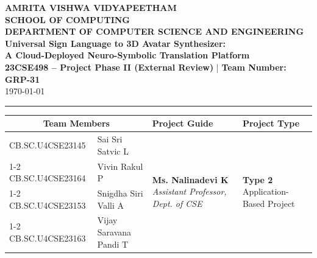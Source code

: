 \documentclass[11pt, a4paper]{article}
\begin{document}
\noindent
\begin{minipage}{\textwidth}
    \centering
    {\Large \textbf{\textcolor{amritaMaroon}{
    AMRITA VISHWA VIDYAPEETHAM \\
    SCHOOL OF COMPUTING \\
    DEPARTMENT OF COMPUTER SCIENCE AND ENGINEERING \\
    }}}
    \vspace{0.2cm}
    {\large \textbf{Universal Sign Language to 3D Avatar Synthesizer: \\ A Cloud-Deployed Neuro-Symbolic Translation Platform}} \\[0.1cm]
    \textbf{23CSE498 -- Project Phase II (External Review)} \quad | \quad \textbf{Team Number: GRP-31} \\
    \today
\end{minipage}

\vspace{0.3cm}
\hrule
\vspace{0.3cm}

\noindent
\begin{center}
    \renewcommand{\arraystretch}{1.4}
    \setlength{\tabcolsep}{6pt}
    \begin{tabular}{|l|p{4.8cm}|p{4.6cm}|p{3.2cm}|}
        \hline
        \multicolumn{2}{|c|}{\textbf{Team Members}} & \textbf{Project Guide} & \textbf{Project Type} \\
        \hline
        \small CB.SC.U4CSE23145 & \small \raggedright Sai Sri Satvic L &
        \multirow{4}{=}{\raggedright \small \textbf{Ms. Nalinadevi K} \newline \textit{Assistant Professor, \newline Dept. of CSE}} &
        \multirow{4}{=}{\raggedright \small \textbf{Type 2} \newline Application-Based Project} \\ \cline{1-2}
        \small CB.SC.U4CSE23164 & \small Vivin Rakul P & & \\ \cline{1-2}
        \small CB.SC.U4CSE23153 & \small Snigdha Siri Valli A & & \\ \cline{1-2}
        \small CB.SC.U4CSE23163 & \small Vijay Saravana Pandi T & & \\
        \hline
    \end{tabular}
\end{center}
\vspace{0.2cm}
\end{document}

